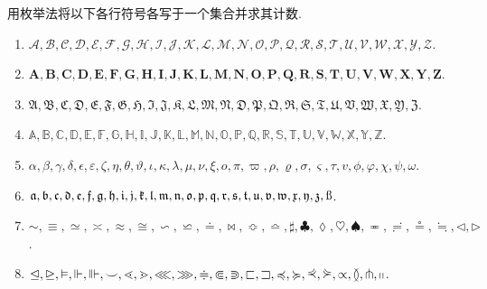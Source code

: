 \begin{2}
用枚举法将以下各行符号各写于一个集合并求其计数.
\begin{enumerate}[label=(\arabic*)]
\item $\mathcal{A}, \mathcal{B}, \mathcal{C}, \mathcal{D}, \mathcal{E}, \mathcal{F}, \mathcal{G}, \mathcal{H}, \mathcal{I}, \mathcal{J}, \mathcal{K}, \mathcal{L}, \mathcal{M}, \mathcal{N}, \mathcal{O}, \mathcal{P}, \mathcal{Q}, \mathcal{R}, \mathcal{S}, \mathcal{T}, \mathcal{U}, \mathcal{V}, \mathcal{W}, \mathcal{X}, \mathcal{Y}, \mathcal{Z}$.
\item $\mathbf{A}, \mathbf{B}, \mathbf{C}, \mathbf{D}, \mathbf{E}, \mathbf{F}, \mathbf{G}, \mathbf{H}, \mathbf{I}, \mathbf{J}, \mathbf{K}, \mathbf{L}, \mathbf{M}, \mathbf{N}, \mathbf{O}, \mathbf{P}, \mathbf{Q}, \mathbf{R}, \mathbf{S}, \mathbf{T}, \mathbf{U}, \mathbf{V}, \mathbf{W}, \mathbf{X}, \mathbf{Y}, \mathbf{Z}$.
\item $\mathfrak{A}, \mathfrak{B}, \mathfrak{C}, \mathfrak{D}, \mathfrak{E}, \mathfrak{F}, \mathfrak{G}, \mathfrak{H}, \mathfrak{I}, \mathfrak{J}, \mathfrak{K}, \mathfrak{L}, \mathfrak{M}, \mathfrak{N}, \mathfrak{D}, \mathfrak{P}, \mathfrak{Q}, \mathfrak{R}, \mathfrak{S}, \mathfrak{T}, \mathfrak{U}, \mathfrak{V}, \mathfrak{W}, \mathfrak{X}, \mathfrak{Y}, \mathfrak{Z}$.
\item $\mathbb{A}, \mathbb{B}, \mathbb{C}, \mathbb{D}, \mathbb{E}, \mathbb{F}, \mathbb{G}, \mathbb{H}, \mathbb{I}, \mathbb{J}, \mathbb{K}, \mathbb{L}, \mathbb{M}, \mathbb{N}, \mathbb{O}, \mathbb{P}, \mathbb{Q}, \mathbb{R}, \mathbb{S}, \mathbb{T}, \mathbb{U}, \mathbb{V}, \mathbb{W}, \mathbb{X}, \mathbb{Y}, \mathbb{Z}$.
\item $\alpha, \beta, \gamma, \delta, \epsilon, \varepsilon, \zeta, \eta, \theta, \vartheta, \iota, \kappa, \lambda, \mu, \nu, \xi, o, \pi, \varpi, \rho, \varrho, \sigma, \varsigma, \tau, v, \phi, \varphi, \chi, \psi, \omega$.
\item $\mathfrak{a}, \mathfrak{b}, \mathfrak{c}, \mathfrak{d}, \mathfrak{e}, \mathfrak{f}, \mathfrak{g}, \mathfrak{h}, \mathfrak{i}, \mathfrak{j}, \mathfrak{k}, \mathfrak{l}, \mathfrak{m}, \mathfrak{n}, \mathfrak{o}, \mathfrak{p}, \mathfrak{q}, \mathfrak{r}, \mathfrak{s}, \mathfrak{t}, \mathfrak{u}, \mathfrak{v}, \mathfrak{w}, \mathfrak{x}, \mathfrak{y}, \mathfrak{z}, \textmd{\ss}$.
\item $\sim, \equiv, \simeq, \asymp, \approx, \cong, \backsim, \backsimeq, \doteq, \bowtie, \Bumpeq, \bumpeq, \sharp, \clubsuit, \lozenge, \heartsuit, \spadesuit, \eqcirc, \risingdotseq, \circeq, \fallingdotseq, \triangleleft, \triangleright$.
\item $\unlhd, \unrhd, \vDash, \Vdash, \Vvdash, \smile, \lessdot, \gtrdot, \lll, \ggg, \doteqdot, \Subset, \Supset, \sqsubset, \sqsupset, \preccurlyeq, \succcurlyeq, \curlyeqprec, \curlyeqsucc, \propto, \between, \pitchfork, \shortparallel$.
\end{enumerate}
\end{2}
